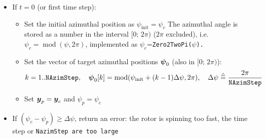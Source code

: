 \documentclass[11pt]{article}
\begin{document}
\begin{itemize}
\begin{itemize}
            \item If $t=0$ (or first time step):
                \begin{itemize}\tightlist
                    \item Set the initial azimuthal position as $\psi_\text{init}=\psi_c$
                        The azimuthal angle is stored as a number in the interval $[0;\, 2\pi )$ ($2\pi$ excluded), i.e. $\psi_c=\operatorname{mod}(\psi, 2\pi)$, implemented as $\psi_c$=\tt{Zero2TwoPi($\psi$)}.
                    \item Set the vector of target azimuthal positions $\boldsymbol{\psi}_0$ (also in $[0;\,2\pi)$):
                            \begin{align}
                                 k=1..\tt{NAzimStep}
                                 ,\quad
                                 \v{\psi}_0[k] = \operatorname{mod}(\psi_\text{init} +  (k-1) \Delta\psi, 2\pi), \quad \Delta\psi\eqdef \frac{2\pi}{\tt{NAzimStep}}
                            \end{align}

                    \item Set $\boldsymbol{y}_p=\boldsymbol{y}_c$ and $\psi_p=\psi_c$
                \end{itemize}

            \item If $(\psi_c -\psi_p) \geq \Delta\psi$, return an error: the rotor is spinning too fast, the time step or \tt{NazimStep} are too large


\end{itemize}
\end{itemize}
\end{document}

